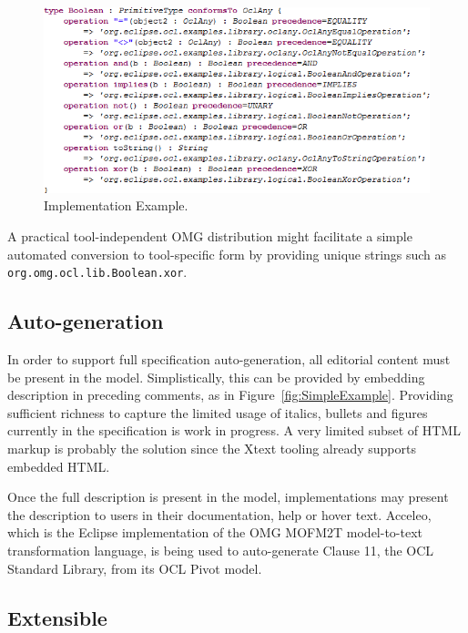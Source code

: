 \documentclass{eceasst}
\begin{document}
\begin{figure}
  \begin{center}
    \includegraphics[width=5.75in]{ImplementationExample.png}
  \end{center}
  \caption{Implementation Example.}
  \label{fig:ImplementationExample}
\end{figure}

A practical tool-independent OMG distribution might facilitate a simple automated conversion to tool-specific form by providing unique strings such as \verb|org.omg.ocl.lib.Boolean.xor|.

\subsection{Auto-generation}

In order to support full specification auto-generation, all editorial content must be present in the model. Simplistically, this can be provided by embedding description in preceding comments, as in Figure~\ref{fig:SimpleExample}. Providing sufficient richness to capture the limited usage of italics, bullets and figures currently in the specification is work in progress. A very limited subset of HTML markup is probably the solution since the Xtext tooling already supports embedded HTML.

Once the full description is present in the model, implementations may present the description to users in their documentation, help or hover text. Acceleo\cite{M2T/Acceleo}, which is the Eclipse implementation of the OMG MOFM2T\cite{MOFM2T} model-to-text transformation language, is being used to auto-generate Clause 11, the OCL Standard Library, from its OCL Pivot model.

\subsection{Extensible}
\end{document}
